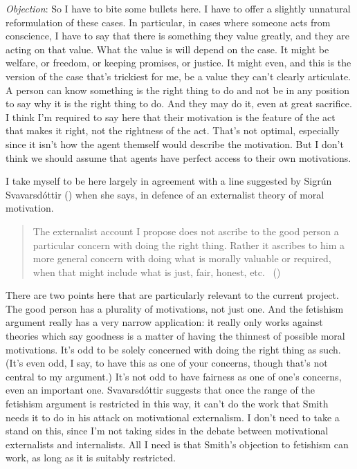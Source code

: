 \documentclass[
  10pt,
  letterpaper,
  DIV=11,
  numbers=noendperiod,
  twoside]{scrartcl}
\begin{document}
\emph{Objection}: So I have to bite some bullets here. I have to offer a
slightly unnatural reformulation of these cases. In particular, in cases
where someone acts from conscience, I have to say that there is
something they value greatly, and they are acting on that value. What
the value is will depend on the case. It might be welfare, or freedom,
or keeping promises, or justice. It might even, and this is the version
of the case that's trickiest for me, be a value they can't clearly
articulate. A person can know something is the right thing to do and not
be in any position to say why it is the right thing to do. And they may
do it, even at great sacrifice. I think I'm required to say here that
their motivation is the feature of the act that makes it right, not the
rightness of the act. That's not optimal, especially since it isn't how
the agent themself would describe the motivation. But I don't think we
should assume that agents have perfect access to their own motivations.

I take myself to be here largely in agreement with a line suggested by
Sigrún Svavarsdóttir () when she
says, in defence of an externalist theory of moral motivation.

\begin{quote}
The externalist account I propose does not ascribe to the good person a
particular concern with doing the right thing. Rather it ascribes to him
a more general concern with doing what is morally valuable or required,
when that might include what is just, fair, honest, etc.
~()
\end{quote}

There are two points here that are particularly relevant to the current
project. The good person has a plurality of motivations, not just one.
And the fetishism argument really has a very narrow application: it
really only works against theories which say goodness is a matter of
having the thinnest of possible moral motivations. It's odd to be solely
concerned with doing the right thing as such. (It's even odd, I say, to
have this as one of your concerns, though that's not central to my
argument.) It's not odd to have fairness as one of one's concerns, even
an important one. Svavarsdóttir suggests that once the range of the
fetishism argument is restricted in this way, it can't do the work that
Smith needs it to do in his attack on motivational externalism. I don't
need to take a stand on this, since I'm not taking sides in the debate
between motivational externalists and internalists. All I need is that
Smith's objection to fetishism can work, as long as it is suitably
restricted.
\end{document}
